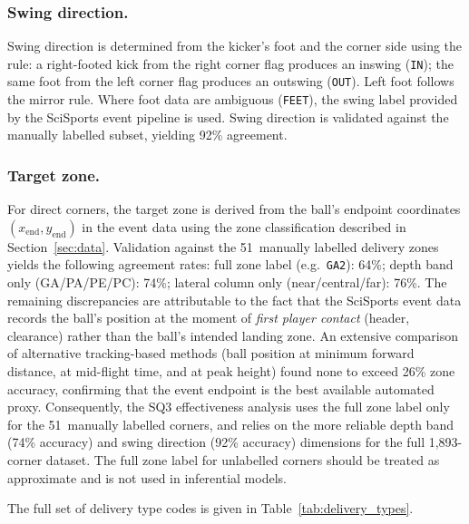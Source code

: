 \subsubsection{Swing direction.}
Swing direction is determined from the kicker's foot and the corner side using
the rule: a right-footed kick from the right corner flag produces an inswing
(\texttt{IN}); the same foot from the left corner flag produces an outswing
(\texttt{OUT}). Left foot follows the mirror rule. Where foot data are ambiguous
(\texttt{FEET}), the swing label provided by the SciSports event pipeline is
used. Swing direction is validated against the manually labelled subset, yielding
92\% agreement.

\subsubsection{Target zone.}
For direct corners, the target zone is derived from the ball's endpoint
coordinates $(x_\mathrm{end}, y_\mathrm{end})$ in the event data using the zone
classification described in Section~\ref{sec:data}. Validation against the 51~manually labelled delivery zones yields the following
agreement rates: full zone label (e.g.\ \texttt{GA2}): 64\%;
depth band only (GA/PA/PE/PC): 74\%; lateral column only (near/central/far):
76\%.
The remaining discrepancies are attributable to the fact that the SciSports
event data records the ball's position at the moment of \emph{first player
contact} (header, clearance) rather than the ball's intended landing zone.
An extensive comparison of alternative tracking-based methods
(ball position at minimum forward distance, at mid-flight time, and at peak
height) found none to exceed 26\% zone accuracy, confirming that the event
endpoint is the best available automated proxy.
Consequently, the SQ3 effectiveness analysis uses the full zone label only for
the 51~manually labelled corners, and relies on the more reliable depth band
(74\% accuracy) and swing direction (92\% accuracy) dimensions for the full
1,893-corner dataset. The full zone label for unlabelled corners should be
treated as approximate and is not used in inferential models.

The full set of delivery type codes is given in Table~\ref{tab:delivery_types}.

